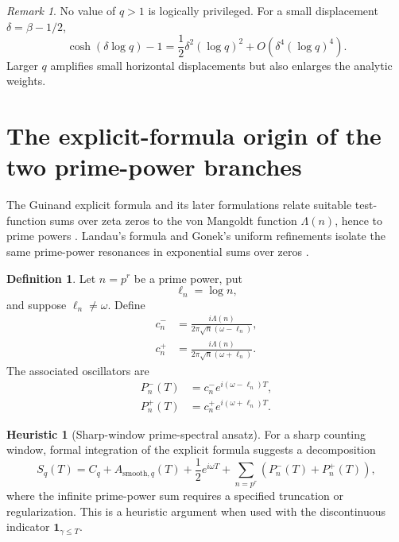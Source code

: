 \documentclass[11pt]{amsart}
\numberwithin{equation}{section}
\theoremstyle{plain}
\theoremstyle{definition}
\newtheorem{definition}[theorem]{Definition}
\newtheorem{heuristic}[theorem]{Heuristic}
\theoremstyle{remark}
\newtheorem{remark}[theorem]{Remark}
\newcommand{\1}{\mathbf{1}}
\begin{document}
\begin{remark}
\label{rem:q_sensitivity}
No value of \(q>1\) is logically privileged.  For a small displacement
\(\delta=\beta-1/2\),
\begin{equation}
\cosh(\delta\log q)-1
=
\frac12\delta^2(\log q)^2
+
O\left(\delta^4(\log q)^4\right).
\label{eq:q_sensitivity}
\end{equation}
Larger \(q\) amplifies small horizontal displacements but also enlarges
the analytic weights.
\end{remark}

\section{The explicit-formula origin of the two prime-power branches}
\label{sec:explicit_formula_branches}

The Guinand explicit formula and its later formulations relate suitable
test-function sums over zeta zeros to the von Mangoldt function
\(\Lambda(n)\), hence to prime powers \cite{Guinand1948,Weil1952}.
Landau's formula and Gonek's uniform refinements isolate the same
prime-power resonances in exponential sums over zeros
\cite{Gonek1985,FordZaharescu2005,FordSoundararajanZaharescu2009}.

\begin{definition}
\label{def:prime_power_coefficients}
Let \(n=p^r\) be a prime power, put
\begin{equation}
\ell_n=\log n,
\label{eq:elln_definition}
\end{equation}
and suppose \(\ell_n\neq\omega\).  Define
\begin{align}
c_n^-
&=
\frac{i\Lambda(n)}
{2\pi\sqrt n(\omega-\ell_n)},
\label{eq:cminus_definition}
\\
c_n^+
&=
\frac{i\Lambda(n)}
{2\pi\sqrt n(\omega+\ell_n)}.
\label{eq:cplus_definition}
\end{align}
The associated oscillators are
\begin{align}
P_n^-(T)
&=
c_n^-e^{i(\omega-\ell_n)T},
\label{eq:Pminus_definition}
\\
P_n^+(T)
&=
c_n^+e^{i(\omega+\ell_n)T}.
\label{eq:Pplus_definition}
\end{align}
\end{definition}

\begin{heuristic}[Sharp-window prime-spectral ansatz]
\label{heur:sharp_window_ansatz}
For a sharp counting window, formal integration of the explicit formula
suggests a decomposition
\begin{equation}
S_q(T)
=
C_q+
A_{\mathrm{smooth},q}(T)
+
\frac12e^{i\omega T}
+
\sum_{n=p^r} \left(P_n^-(T)+P_n^+(T)\right),
\label{eq:formal_sharp_decomposition}
\end{equation}
where the infinite prime-power sum requires a specified truncation or
regularization.  This is a heuristic argument when used with the
discontinuous indicator \(\1_{\gamma\leq T}\).
\end{heuristic}
\end{document}
